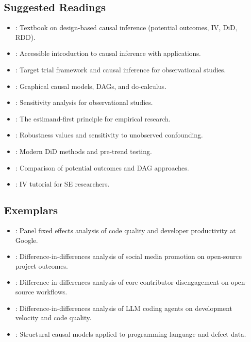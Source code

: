 \subsection{Suggested Readings}

\begin{itemize}[leftmargin=15pt]
    \item \citet{angrist2009mostly}: Textbook on design-based causal inference (potential outcomes, IV, DiD, RDD).
    \item \citet{cunningham2021causal}: Accessible introduction to causal inference with applications.
    \item \citet{hernan2020causal}: Target trial framework and causal inference for observational studies.
    \item \citet{pearl2009causality}: Graphical causal models, DAGs, and do-calculus.
    \item \citet{rosenbaum2002observational}: Sensitivity analysis for observational studies.
    \item \citet{lundberg2021estimand}: The estimand-first principle for empirical research.
    \item \citet{cinelli2020making}: Robustness values and sensitivity to unobserved confounding.
    \item \citet{roth2023whats}: Modern DiD methods and pre-trend testing.
    \item \citet{imbens2020potential}: Comparison of potential outcomes and DAG approaches.
    \item \citet{DBLP:journals/tosem/GrafVlachyW24}: IV tutorial for SE researchers.
\end{itemize}

\subsection{Exemplars}

\begin{itemize}[leftmargin=15pt]
    \item \citet{DBLP:conf/sigsoft/ChengMCJGKZ022}: Panel fixed effects analysis of code quality and developer productivity at Google.
    \item \citet{DBLP:conf/icse/FangLHV22}: Difference-in-differences analysis of social media promotion on open-source project outcomes.
    \item \citet{DBLP:conf/icse/ChenSSGT26}: Difference-in-differences analysis of core contributor disengagement on open-source workflows.
    \item \citet{DBLP:conf/msr/HeMAKV26}: Difference-in-differences analysis of LLM coding agents on development velocity and code quality.
    \item \citet{DBLP:journals/tosem/FuriaTF24}: Structural causal models applied to programming language and defect data.
\end{itemize}

\let\section\origsection
\let\subsection\origsubsection
